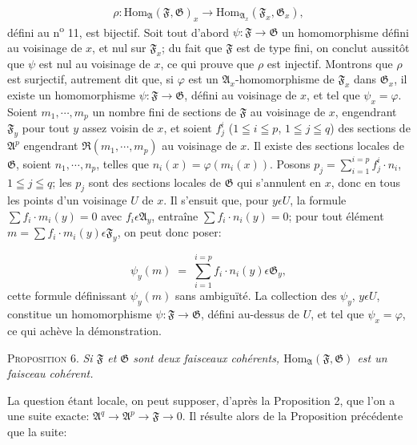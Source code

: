 \begin{equation*}
\rho : \mathrm{Hom}_{\mathfrak{A}}(\mathfrak{F}, \mathfrak{G})_x \to \mathrm{Hom}_{\mathfrak{A}_x}(\mathfrak{F}_x, \mathfrak{G}_x),
\end{equation*}
défini au n\textsuperscript{o} 11, est bijectif. Soit tout d'abord $\psi: \mathfrak{F} \to \mathfrak{G}$ un homomorphisme défini au voisinage de $x$, et nul sur $\mathfrak{F}_x$; du fait que $\mathfrak{F}$ est de type fini, on conclut aussitôt que $\psi$ est nul au voisinage de $x$, ce qui prouve que $\rho$ est injectif. Montrons que $\rho$ est surjectif, autrement dit que, si $\varphi$ est un $\mathfrak{A}_x$-homomorphisme de
$\mathfrak{F}_x$ dans $\mathfrak{G}_x$, il existe un homomorphisme $\psi: \mathfrak{F} \to \mathfrak{G}$, défini au voisinage de $x$, et tel que $\psi_x = \varphi$. Soient $m_1, \cdots, m_p$ un nombre fini de sections de $\mathfrak{F}$ au voisinage de $x$, engendrant $\mathfrak{F}_y$ pour tout $y$ assez voisin de $x$, et soient $f_j^i$ ($1 \leqq i \leqq p$, $1 \leqq j \leqq q$) des sections de $\mathfrak{A}^p$ engendrant $\mathfrak{R}(m_1, \cdots, m_p)$ au voisinage de $x$. Il existe des sections locales de $\mathfrak{G}$, soient $n_1, \cdots, n_p$, telles que $n_i(x) = \varphi(m_i(x))$. Posons $p_j = \sum_{i=1}^{i=p} f_j^i \cdot n_i$, $1 \leqq j \leqq q$; les $p_j$ sont des sections locales de $\mathfrak{G}$ qui s'annulent en $x$, donc en tous les points d'un voisinage $U$ de $x$. Il s'ensuit que, pour $y \epsilon U$, la formule $\sum f_i \cdot m_i(y) = 0$ avec $f_i \epsilon \mathfrak{A}_y$, entraîne $\sum f_i \cdot n_i(y) = 0$; pour tout élément $m = \sum f_i \cdot m_i(y) \epsilon \mathfrak{F}_y$, on peut donc poser:

\begin{equation*}
\psi_y(m) \;=\; \sum_{i=1}^{i=p} f_i \cdot n_i(y) \epsilon \mathfrak{G}_y ,
\end{equation*}
cette formule définissant $\psi_y(m)$ sans ambiguïté. La collection des $\psi_y$, $y \epsilon U$, constitue un homomorphisme $\psi: \mathfrak{F} \to \mathfrak{G}$, défini au-dessus de $U$, et tel que $\psi_x = \varphi$, ce qui achève la démonstration.

\textsc{Proposition} 6. \emph{Si $\mathfrak{F}$ et $\mathfrak{G}$ sont deux faisceaux cohérents, $\mathrm{Hom}_{\mathfrak{A}}(\mathfrak{F}, \mathfrak{G})$ est un faisceau cohérent.}

La question étant locale, on peut supposer, d'après la Proposition 2, que l'on a une suite exacte: $\mathfrak{A}^q \to \mathfrak{A}^p \to \mathfrak{F} \to 0$. Il résulte alors de la Proposition précédente que la suite:

